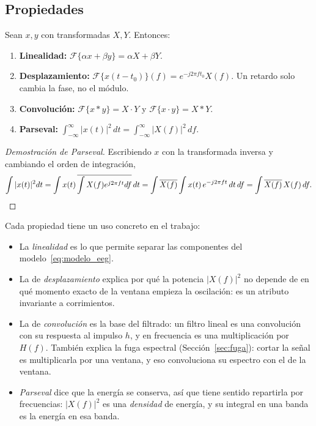 \subsection{Propiedades}

\begin{proposicion}
Sean $x, y$ con transformadas $X, Y$. Entonces:
\begin{enumerate}
  \item \textbf{Linealidad:} $\mathcal{F}\{\alpha x + \beta y\} = \alpha X + \beta Y$.
  \item \textbf{Desplazamiento:} $\mathcal{F}\{x(t - t_0)\}(f) = e^{-j2\pi f t_0}X(f)$. Un retardo solo cambia la
        fase, no el módulo.
  \item \textbf{Convolución:} $\mathcal{F}\{x * y\} = X\cdot Y$ y $\mathcal{F}\{x\cdot y\} = X * Y$.
  \item \textbf{Parseval:} $\displaystyle\int_{-\infty}^{\infty} |x(t)|^2\,dt = \int_{-\infty}^{\infty} |X(f)|^2\, df$.
\end{enumerate}
\end{proposicion}

\begin{proof}[Demostración de Parseval]
Escribiendo $x$ con la transformada inversa y cambiando el orden de integración,
\[
\int |x(t)|^2 dt = \int x(t)\,\overline{\int X(f)e^{j2\pi ft}df}\,dt
= \int \overline{X(f)} \int x(t)\, e^{-j2\pi ft}\,dt\,df = \int \overline{X(f)}\,X(f)\,df. \qedhere
\]
\end{proof}

Cada propiedad tiene un uso concreto en el trabajo:
\begin{itemize}
  \item La \emph{linealidad} es lo que permite separar las componentes del modelo~\eqref{eq:modelo_eeg}.
  \item La de \emph{desplazamiento} explica por qué la potencia $|X(f)|^2$ no depende de en qué momento exacto
        de la ventana empieza la oscilación: es un atributo invariante a corrimientos.
  \item La de \emph{convolución} es la base del filtrado: un filtro lineal es una convolución con su respuesta al
        impulso $h$, y en frecuencia es una multiplicación por $H(f)$. También explica la fuga espectral
        (Sección~\ref{sec:fuga}): cortar la señal es multiplicarla por una ventana, y eso convoluciona su
        espectro con el de la ventana.
  \item \emph{Parseval} dice que la energía se conserva, así que tiene sentido repartirla por frecuencias:
        $|X(f)|^2$ es una \emph{densidad} de energía, y su integral en una banda es la energía en esa banda.
\end{itemize}

